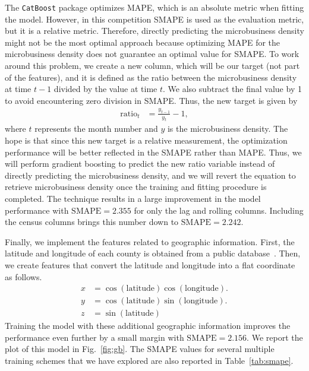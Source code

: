 \documentclass[prl,aps,superscriptaddress,twocolumn,10pt,nolongbibliography]{revtex4-2}
\begin{document}
The \lstinline{CatBoost} package optimizes MAPE, which is an absolute metric when fitting the model. 
However, in this competition SMAPE is used as the evaluation metric, but it is a relative metric. 
Therefore, directly predicting the microbusiness density might not be the most optimal approach because optimizing MAPE for the microbusiness density does not guarantee an optimal value for SMAPE. 
To work around this problem, we create a new column, which will be our target (not part of the features), and it is defined as the ratio between the microbusiness density at time $t-1$ divided by the value at time $t$. 
We also subtract the final value by 1 to avoid encountering zero division in SMAPE. 
Thus, the new target is given by
\begin{align}
\textrm{ratio}_t &= \frac{y_{t-1}}{y_t} - 1,   
\end{align}
where $t$ represents the month number and $y$ is the microbusiness density. 
The hope is that since this new target is a relative measurement, the optimization performance will be better reflected in the SMAPE rather than MAPE.
Thus, we will perform gradient boosting to predict the new ratio variable instead of directly predicting the microbusiness density, and we will revert the equation to retrieve microbusiness density once the training and fitting procedure is completed.
The technique results in a large improvement in the model performance with $\textrm{SMAPE} = 2.355$ for only the lag and rolling columns.
Including the census columns brings this number down to $\textrm{SMAPE} = 2.242$.

Finally, we implement the features related to geographic information. 
First, the latitude and longitude of each county is obtained from a public database~\cite{uscoordinates}. 
Then, we create features that convert the latitude and longitude into a flat coordinate as follows.
\begin{align}
x &= \cos(\textrm{latitude}) \cos(\textrm{longitude}). \\
y &= \cos(\textrm{latitude}) \sin(\textrm{longitude}). \\
z &= \sin(\textrm{latitude})
\end{align}
Training the model with these additional geographic information improves the performance even further by a small margin with $\textrm{SMAPE} = 2.156$.
We report the plot of this model in Fig.~\ref{fig:gb}. 
The SMAPE values for several multiple training schemes that we have explored are also reported in Table~\ref{tab:smape}.
\end{document}
